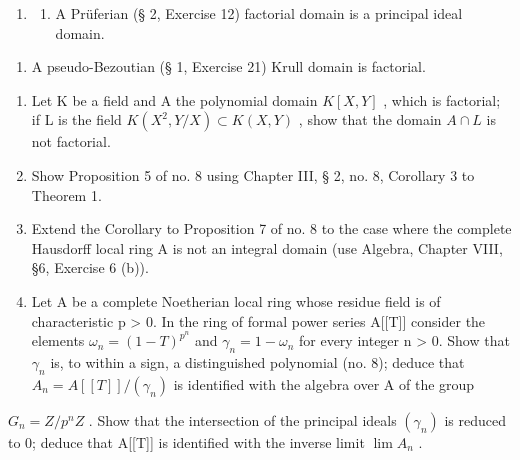 \begin{enumerate}
\def\labelenumi{\arabic{enumi}.}
\setcounter{enumi}{9}
\tightlist
\item
  \begin{enumerate}
  \def\labelenumii{(\alph{enumii})}
  \tightlist
  \item
    A Prüferian (§ 2, Exercise 12) factorial domain is a principal ideal domain.
  \end{enumerate}
\end{enumerate}

\begin{enumerate}
\def\labelenumi{(\alph{enumi})}
\setcounter{enumi}{1}
\tightlist
\item
  A pseudo-Bezoutian (§ 1, Exercise 21) Krull domain is factorial.
\end{enumerate}

\begin{enumerate}
\def\labelenumi{\arabic{enumi}.}
\setcounter{enumi}{10}
\item
  Let K be a field and A the polynomial domain \(K[X,Y]\) , which is factorial; if L is the field \(K(X^{2},Y/X) \subset K(X,Y)\) , show that the domain \(A \cap L\) is not factorial.
\item
  Show Proposition 5 of no. 8 using Chapter III, § 2, no. 8, Corollary 3 to Theorem 1.
\item
  Extend the Corollary to Proposition 7 of no. 8 to the case where the complete Hausdorff local ring A is not an integral domain (use Algebra, Chapter VIII, §6, Exercise 6 (b)).
\item
  Let A be a complete Noetherian local ring whose residue field is of characteristic p \textgreater{} 0. In the ring of formal power series A{[}{[}T{]}{]} consider the elements \(\omega_{n} = (1 - T)^{p^{n}}\) and \(\gamma_{n} = 1 - \omega_{n}\) for every integer n \textgreater{} 0. Show that \(\gamma_{n}\) is, to within a sign, a distinguished polynomial (no. 8); deduce that \(A_{n} = A[[T]]/(\gamma_{n})\) is identified with the algebra over A of the group
\end{enumerate}

\(G_{n} = Z/p^{n}Z\) . Show that the intersection of the principal ideals \((\gamma_{n})\) is reduced to 0; deduce that A{[}{[}T{]}{]} is identified with the inverse limit \(\lim A_{n}\) .


